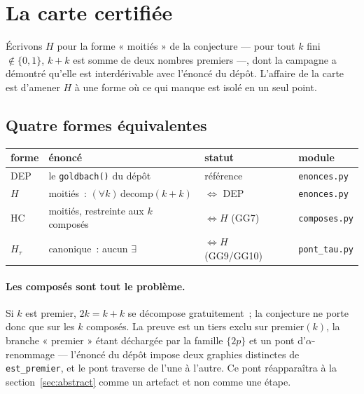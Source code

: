 \documentclass[11pt]{article}
\theoremstyle{remark}\newtheorem{remarque}{Remarque}
\begin{document}
\section{La carte certifiée}
\label{sec:map}

Écrivons $H$ pour la forme « moitiés » de la conjecture --- pour tout $k$ fini
$\notin \{0,1\}$, $k+k$ est somme de deux nombres premiers ---, dont la campagne a
démontré qu'elle est interdérivable avec l'énoncé du dépôt. L'affaire de la carte est
d'amener $H$ à une forme où ce qui manque est isolé en un seul point.

\subsection{Quatre formes équivalentes}

\begin{center}
\begin{tabular}{@{}llll@{}}
\toprule
forme & énoncé & statut & module \\
\midrule
DEP & le \texttt{goldbach()} du dépôt & référence & \texttt{enonces.py} \\
$H$ & moitiés~: $(\forall k)\,\mathrm{decomp}(k{+}k)$ & $\Leftrightarrow$ DEP & \texttt{enonces.py} \\
HC & moitiés, restreinte aux $k$ composés & $\Leftrightarrow H$ (GG7) & \texttt{composes.py} \\
$H_\tau$ & canonique~: aucun $\exists$ & $\Leftrightarrow H$ (GG9/GG10) & \texttt{pont\_tau.py} \\
\bottomrule
\end{tabular}
\end{center}

\paragraph{Les composés sont tout le problème.} Si $k$ est premier, $2k = k+k$ se
décompose gratuitement~; la conjecture ne porte donc que sur les $k$ composés. La preuve
est un tiers exclu sur $\mathrm{premier}(k)$, la branche « premier » étant déchargée par
la famille $\{2p\}$ et un pont d'$\alpha$-renommage --- l'énoncé du dépôt impose deux
graphies distinctes de \texttt{est\_premier}, et le pont traverse de l'une à l'autre. Ce
pont réapparaîtra à la section~\ref{sec:abstract} comme un artefact et non comme une
étape.
\end{document}

